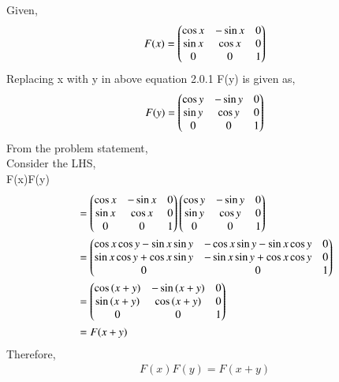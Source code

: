 Given,
\\
\begin{align}
    F(x)=\begin{pmatrix}
\cos{x} & -\sin{x} & 0\\
\sin{x} & \cos{x} & 0\\
0 & 0 & 1
\end{pmatrix}
\end{align}
Replacing x with y in above equation 2.0.1 F(y) is given as,
\begin{align}
    F(y)=\begin{pmatrix}
\cos{y} & -\sin{y} & 0\\
\sin{y} & \cos{y} & 0\\
0 & 0 & 1
\end{pmatrix}
\end{align}
From the problem statement,\\
Consider the LHS,\\
F(x)F(y)
\begin{align}
&=\begin{pmatrix}
\cos{x} & -\sin{x} & 0\\
\sin{x} & \cos{x} & 0\\
0 & 0 & 1
\end{pmatrix}\begin{pmatrix}
\cos{y} & -\sin{y} & 0\\
\sin{y} & \cos{y} & 0\\
0 & 0 & 1
\end{pmatrix}\\
&=\begin{pmatrix}
\cos{x}\cos{y}-\sin{x}\sin{y} & -\cos{x}\sin{y}-\sin{x}\cos{y} & 0\\
\sin{x}\cos{y}+\cos{x}\sin{y} & -\sin{x}\sin{y}+\cos{x}\cos{y} & 0\\
0 & 0 & 1
\end{pmatrix}\\
&=\begin{pmatrix}
\cos{(x+y)} & -\sin{(x+y)} & 0\\
\sin{(x+y)} & \cos{(x+y)} & 0\\
0 & 0 & 1
\end{pmatrix}\\
&=F(x+y)
\end{align}
Therefore, 
\begin{align}
    F(x)F(y)=F(x+y)
\end{align}
